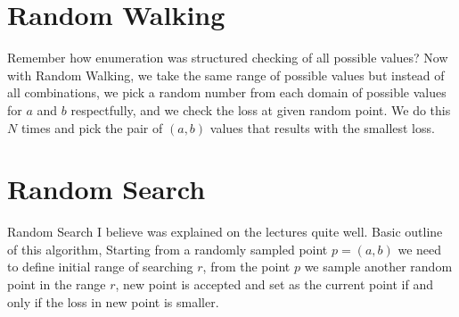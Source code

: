 \documentclass{article}
\begin{document}
\break

\section{Random Walking}

Remember how enumeration was structured checking of all possible values? Now with Random Walking, we take the same range of possible values but instead of all combinations, we pick a random number from each domain of possible values for $a$ and $b$ respectfully, and we check the loss at given random point. We do this $N$ times and pick the pair of $(a, b)$ values that results with the smallest loss.

\section{Random Search}

Random Search I believe was explained on the lectures quite well. Basic outline of this algorithm, Starting from a randomly sampled point $p = (a, b)$ we need to define initial range of searching $r$, from the point $p$ we sample another random point in the range $r$, new point is accepted and set as the current point if and only if the loss in new point is smaller.
\end{document}
